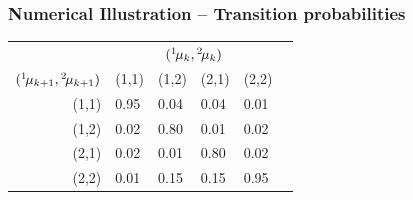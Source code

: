 \documentclass[usenames,dvipsnames]{beamer}
\def\ist{\prescript{1\!}{}}
\def\iind{\prescript{2\!}{}}
\begin{document}
\begin{frame}
  \frametitle{Numerical Illustration --  Transition probabilities}
\begin{center}
  \begin{tabular}{rlllll}\toprule
     & \multicolumn{4}{c}{$(\ist{\mu}_{k},\iind{\mu}_{k})$}\\
    \cmidrule{2-5}
    $(\ist{\mu}_{k+1},\iind{\mu}_{k+1})$ & (1,1) &  (1,2) & (2,1) & (2,2)\\\midrule 
    (1,1) & 0.95 & 0.04 & 0.04 & 0.01 \\
    (1,2) & 0.02 & 0.80 & 0.01 & 0.02 \\
    (2,1) & 0.02 & 0.01 & 0.80 & 0.02 \\
    (2,2) & 0.01 & 0.15 & 0.15 & 0.95 \\\bottomrule
  \end{tabular}
\end{center}

\end{frame}
\end{document}
